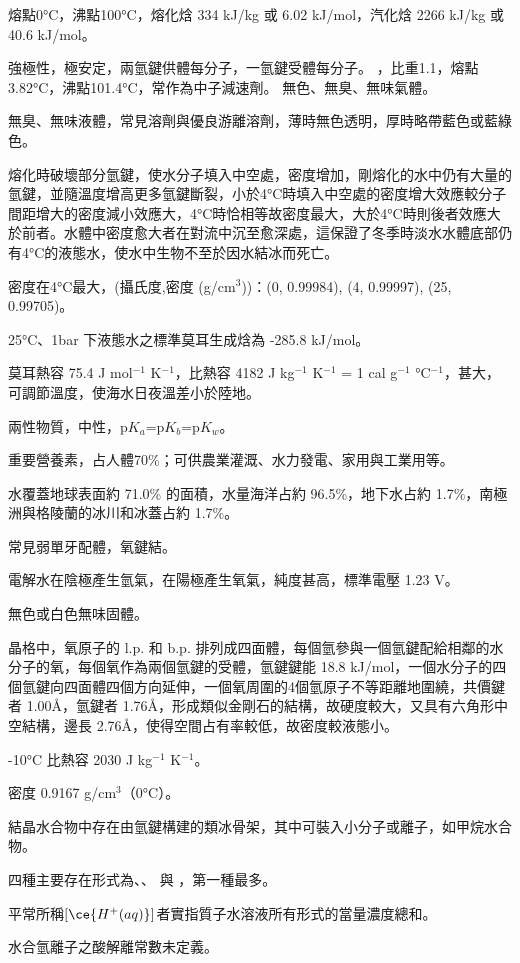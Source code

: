 \documentclass[a4paper,12pt]{report}
\begin{document}
\eit
{}
\bit
\item 熔點0°C，沸點100°C，熔化焓 334 kJ/kg 或 6.02 kJ/mol，汽化焓 2266 kJ/kg 或 40.6 kJ/mol。
\item 強極性，極安定，兩氫鍵供體每分子，一氫鍵受體每分子。
\eit
{}
，比重1.1，熔點3.82°C，沸點101.4°C，常作為中子減速劑。
無色、無臭、無味氣體。
\bit
\item 無臭、無味液體，常見溶劑與優良游離溶劑，薄時無色透明，厚時略帶藍色或藍綠色。
\item 熔化時破壞部分氫鍵，使水分子填入中空處，密度增加，剛熔化的水中仍有大量的氫鍵，並隨溫度增高更多氫鍵斷裂，小於4°C時填入中空處的密度增大效應較分子間距增大的密度減小效應大，4°C時恰相等故密度最大，大於4°C時則後者效應大於前者。水體中密度愈大者在對流中沉至愈深處，這保證了冬季時淡水水體底部仍有4°C的液態水，使水中生物不至於因水結冰而死亡。
\item 密度在4°C最大，(攝氏度,密度 (g/cm$^3$))：(0, 0.99984), (4, 0.99997), (25, 0.99705)。
\item 25°C、1bar 下液態水之標準莫耳生成焓為 -285.8 kJ/mol。
\item 莫耳熱容 75.4 J mol$^{-1}$ K$^{-1}$，比熱容 4182 J kg$^{-1}$ K$^{-1}$ = 1 cal g$^{-1}$ °C$^{-1}$，甚大，可調節溫度，使海水日夜溫差小於陸地。
\item 兩性物質，中性，p$K_a$=p$K_b$=p$K_w$。
\item 重要營養素，占人體70\%；可供農業灌溉、水力發電、家用與工業用等。
\item 水覆蓋地球表面約 71.0\% 的面積，水量海洋占約 96.5\%，地下水占約 1.7\%，南極洲與格陵蘭的冰川和冰蓋占約 1.7\%。
\item 常見弱單牙配體，氧鍵結。
\item 電解水在陰極產生氫氣，在陽極產生氧氣，純度甚高，標準電壓 1.23 V。
\eit
{}
\bit
\item 無色或白色無味固體。
\item 晶格中，氧原子的 l.p. 和 b.p. 排列成四面體，每個氫參與一個氫鍵配給相鄰的水分子的氧，每個氧作為兩個氫鍵的受體，氫鍵鍵能 18.8 kJ/mol，一個水分子的四個氫鍵向四面體四個方向延伸，一個氧周圍的4個氫原子不等距離地圍繞，共價鍵者 1.00\AA，氫鍵者 1.76\AA，形成類似金剛石的結構，故硬度較大，又具有六角形中空結構，邊長  2.76\AA，使得空間占有率較低，故密度較液態小。
\item -10°C 比熱容 2030 J kg$^{-1}$ K$^{-1}$。
\item 密度 0.9167 g/cm$^3$（0°C）。
\item 結晶水合物中存在由氫鍵構建的類冰骨架，其中可裝入小分子或離子，如甲烷水合物。
\eit
{}
\bit
\item 四種主要存在形式為、、 與 ，第一種最多。
\item 平常所稱$[\ce{H^+(aq)}]$者實指質子水溶液所有形式的當量濃度總和。
\item 水合氫離子之酸解離常數未定義。
\eit
{}
\end{document}
